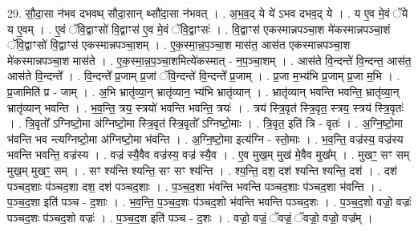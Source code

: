 \documentclass[17pt]{extarticle}
\begin{document}
29. सौ॒दा॒सा न॑भव दभवथ् सौदा॒सान् थ्सौ॑दा॒सा न॑भवत् । . अ॒भ॒व॒द् ये ये॑ ऽभव दभव॒द् ये । . य ए॒व मे॒वं ॅये य ए॒वम् । . ए॒वं ॅवि॒द्वाꣳसो॑ वि॒द्वाꣳस॑ ए॒व मे॒वं ॅवि॒द्वाꣳसः॑ । . वि॒द्वाꣳस॑ एकस्मान्नपञ्चा॒श मे॑कस्मान्नपञ्चा॒शं ॅवि॒द्वाꣳसो॑ वि॒द्वाꣳस॑ एकस्मान्नपञ्चा॒शम् । . ए॒क॒स्मा॒न्न॒प॒ञ्चा॒श मास॑त॒ आस॑त एकस्मान्नपञ्चा॒श मे॑कस्मान्नपञ्चा॒श मास॑ते । . ए॒क॒स्मा॒न्न॒प॒ञ्चा॒शमित्ये॑कस्मात् - न॒प॒ञ्चा॒शम् । . आस॑ते वि॒न्दन्ते॑ वि॒न्दन्त॒ आस॑त॒ आस॑ते वि॒न्दन्ते᳚ । . वि॒न्दन्ते᳚ प्र॒जाम् प्र॒जां ॅवि॒न्दन्ते॑ वि॒न्दन्ते᳚ प्र॒जाम् । . प्र॒जा म॒भ्य॑भि प्र॒जाम् प्र॒जा म॒भि । . प्र॒जामिति॑ प्र - जाम् । . अ॒भि भ्रातृ॑व्या॒न् भ्रातृ॑व्यान॒ भ्य॑भि भ्रातृ॑व्यान् । . भ्रातृ॑व्यान् भवन्ति भवन्ति॒ भ्रातृ॑व्या॒न् भ्रातृ॑व्यान् भवन्ति । . भ॒व॒न्ति॒ त्रय॒ स्त्रयो॑ भवन्ति भवन्ति॒ त्रयः॑ । . त्रय॑ स्त्रि॒वृत॑ स्त्रि॒वृत॒ स्त्रय॒ स्त्रय॑ स्त्रि॒वृतः॑ । . त्रि॒वृतो᳚ ऽग्निष्टो॒मा अ॑ग्निष्टो॒मा स्त्रि॒वृत॑ स्त्रि॒वृतो᳚ ऽग्निष्टो॒माः । . त्रि॒वृत॒ इति॑ त्रि - वृतः॑ । . अ॒ग्नि॒ष्टो॒मा भ॑वन्ति भव न्त्यग्निष्टो॒मा अ॑ग्निष्टो॒मा भ॑वन्ति । . अ॒ग्नि॒ष्टो॒मा इत्य॑ग्नि - स्तो॒माः । . भ॒व॒न्ति॒ वज्र॑स्य॒ वज्र॑स्य भवन्ति भवन्ति॒ वज्र॑स्य । . वज्र॑ स्यै॒वैव वज्र॑स्य॒ वज्र॑ स्यै॒व । . ए॒व मुख॒म् मुख॑ मे॒वैव मुख᳚म् । . मुखꣳ॒॒ सꣳ सम् मुख॒म् मुखꣳ॒॒ सम् । . सꣳ श्य॑न्ति श्यन्ति॒ सꣳ सꣳ श्य॑न्ति । . श्य॒न्ति॒ दश॒ दश॑ श्यन्ति श्यन्ति॒ दश॑ । . दश॑ पञ्चद॒शाः प॑ञ्चद॒शा दश॒ दश॑ पञ्चद॒शाः । . प॒ञ्च॒द॒शा भ॑वन्ति भवन्ति पञ्चद॒शाः प॑ञ्चद॒शा भ॑वन्ति । . प॒ञ्च॒द॒शा इति॑ पञ्च - द॒शाः । . भ॒व॒न्ति॒ प॒ञ्च॒द॒शः प॑ञ्चद॒शो भ॑वन्ति भवन्ति पञ्चद॒शः । . प॒ञ्च॒द॒शो वज्रो॒ वज्रः॑ पञ्चद॒शः प॑ञ्चद॒शो वज्रः॑ । . प॒ञ्च॒द॒श इति॑ पञ्च - द॒शः । . वज्रो॒ वज्रं॒ ॅवज्रं॒ ॅवज्रो॒ वज्रो॒ वज्र᳚म् । \newline
\end{document}
